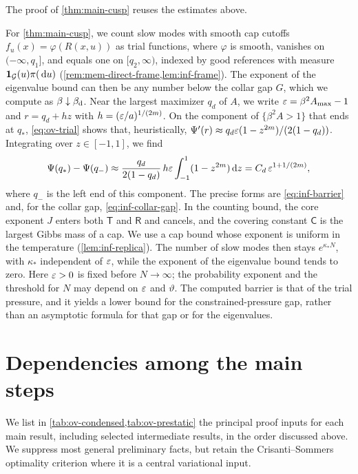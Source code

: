 The proof of \cref{thm:main-cusp} reuses the estimates above.

For \cref{thm:main-cusp}, we count slow modes with smooth cap cutoffs $f_u(x)=\varphi(R(x,u))$ as trial functions, where $\varphi$ is smooth, vanishes on $(-\infty,q_1]$, and equals one on $[q_2,\infty)$, indexed by good references with measure $\mathbf 1_{\mathcal G}(u)\pi(\,\mathrm d u)$ (\cref{rem:mem-direct-frame,lem:inf-frame}). The exponent of the eigenvalue bound can then be any number below the collar gap $G$, which we compute as $\beta\downarrow\beta_{\mathrm d}$. Near the largest maximizer $q_d$ of $A$, we write $\varepsilon=\beta^2A_{\max}-1$ and $r=q_d+hz$ with $h=(\varepsilon/a)^{1/(2m)}$. On the component of $\{\beta^2A>1\}$ that ends at $q_*$, \eqref{eq:ov-trial} shows that, heuristically, $\Psi'(r)\approx q_d\varepsilon(1-z^{2m})/(2(1-q_d))$. Integrating over $z\in[-1,1]$, we find
\begin{equation}\label{eq:ov-cusp}
\Psi(q_*)-\Psi(q_-)\approx\frac{q_d}{2(1-q_d)}\,h\varepsilon\int_{-1}^1(1-z^{2m})\,\mathrm d z=C_d\,\varepsilon^{1+1/(2m)},
\end{equation}
where $q_-$ is the left end of this component. The precise forms are \eqref{eq:inf-barrier} and, for the collar gap, \eqref{eq:inf-collar-gap}. In the counting bound, the core exponent $J$ enters both $\mathsf T$ and $\mathsf R$ and cancels, and the covering constant $\mathsf C$ is the largest Gibbs mass of a cap. We use a cap bound whose exponent is uniform in the temperature (\cref{lem:inf-replica}). The number of slow modes then stays $e^{\kappa_*N}$, with $\kappa_*$ independent of $\varepsilon$, while the exponent of the eigenvalue bound tends to zero. Here $\varepsilon>0$ is fixed before $N\to\infty$; the probability exponent and the threshold for $N$ may depend on $\varepsilon$ and $\vartheta$. The computed barrier is that of the trial pressure, and it yields a lower bound for the constrained-pressure gap, rather than an asymptotic formula for that gap or for the eigenvalues.

\section{Dependencies among the main steps}\label{sec:ov-dependencies}

We list in \cref{tab:ov-condensed,tab:ov-prestatic} the principal proof inputs for each main result, including selected intermediate results, in the order discussed above. We suppress most general preliminary facts, but retain the Crisanti--Sommers optimality criterion where it is a central variational input.

